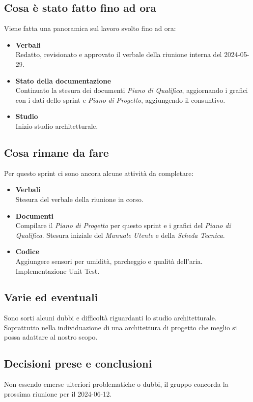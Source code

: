 \documentclass[italian,12pt]{article}
\begin{document}
\subsection{Cosa è stato fatto fino ad ora}
Viene fatta una panoramica sul lavoro svolto fino ad ora:
\begin{itemize}
	\item \textbf{Verbali} \\
		  Redatto, revisionato e approvato il verbale della riunione interna del 2024-05-29.
	\item \textbf{Stato della documentazione} \\
		  Continuato la stesura dei documenti \textit{Piano di Qualifica}, aggiornando i grafici con i dati dello sprint e \textit{Piano di Progetto}, aggiungendo il consuntivo.
	\item \textbf{Studio} \\
		  Inizio studio architetturale.
\end{itemize}

\subsection{Cosa rimane da fare}
Per questo sprint ci sono ancora alcune attività da completare:
\begin{itemize}
	\item \textbf{Verbali} \\
		  Stesura del verbale della riunione in corso.
	\item \textbf{Documenti} \\
		  Compilare il \textit{Piano di Progetto} per questo sprint e i grafici del \textit{Piano di Qualifica}.
		  Stesura iniziale del \textit{Manuale Utente} e della \textit{Scheda Tecnica}.
	\item \textbf{Codice} \\
		  Aggiungere sensori per umidità, parcheggio e qualità dell'aria. Implementazione Unit Test.
\end{itemize}

\subsection{Varie ed eventuali}
Sono sorti alcuni dubbi e difficoltà riguardanti lo studio architetturale. Soprattutto nella individuazione di una architettura di progetto che meglio si possa adattare al nostro scopo.

\subsection{Decisioni prese e conclusioni}
Non essendo emerse ulteriori problematiche o dubbi, il gruppo concorda la prossima riunione per il 2024-06-12.
\end{document}
